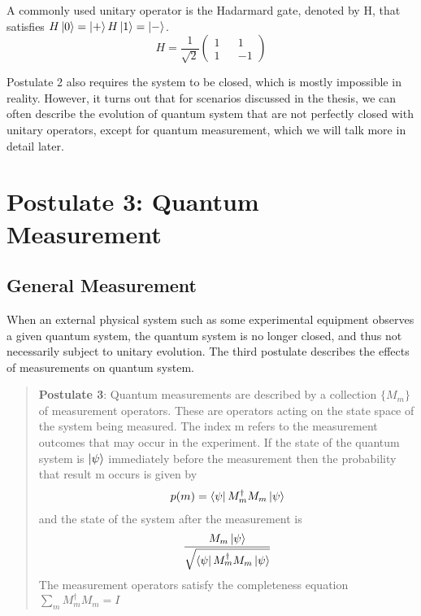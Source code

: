 \begin{example} 
A commonly used unitary operator is the Hadarmard gate, denoted by H, that satisfies $H\ket{0}=\ket{+}\\
H\ket{1}=\ket{-}$.
\begin{equation}
   H=\frac{1}{\sqrt{2}}\begin{pmatrix}
1 && 1\\
1 && -1
\end{pmatrix} 
\end{equation}
\end{example}


Postulate 2 also requires the system to be closed, which is mostly impossible in reality. However, it turns out that for scenarios discussed in the thesis, we can often describe the evolution of quantum system that are not perfectly closed with unitary operators, except for quantum measurement, which we will talk more in detail later.

\section{Postulate 3: Quantum Measurement}
\subsection{General Measurement}
When an external physical system such as some experimental equipment observes a given quantum system, the quantum system is no longer closed, and thus not necessarily subject to unitary evolution. The third postulate describes the effects of measurements on quantum system. 

\begin{quote}
    \textbf{Postulate 3}: Quantum measurements are described by a collection $\{M_m\}$ of measurement operators. These are operators acting on the state space of the system being measured. The index m refers to the measurement outcomes that may occur in the experiment. If the state of the quantum system is $\ket{\psi}$ immediately before the measurement then the probability that result m occurs is given by 
    \begin{gather*}
        p(m)=\bra{\psi}M_m^\dagger M_m \ket{\psi}
    \end{gather*}
    and the state of the system after the measurement is
    \begin{gather*}
        \frac{M_m \ket{\psi}}{\sqrt{\bra{\psi}M_m^\dagger M_m \ket{\psi}}}
    \end{gather*}
    The measurement operators satisfy the completeness equation $\sum_m M_m^\dagger M_m =I$
\end{quote}

